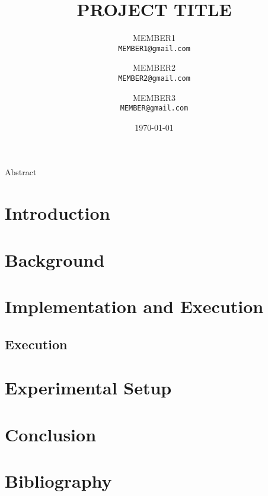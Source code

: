 \documentclass[10pt]{article}
\title{PROJECT TITLE}
\author{
    MEMBER1 \\
    \texttt{MEMBER1@gmail.com}
    \and
    MEMBER2 \\
    \texttt{MEMBER2@gmail.com}
    \and
    MEMBER3 \\
    \texttt{MEMBER@gmail.com}
}
\date{\today}
\begin{document}
\maketitle

\begin{center}    
\large{Abstract}


\end{center}


\section{Introduction}


\section{Background}



\section{Implementation and Execution}


\subsection{Execution}


\section{Experimental Setup}



\section{Conclusion}

\section*{Bibliography }


\clearpage
\end{document}
